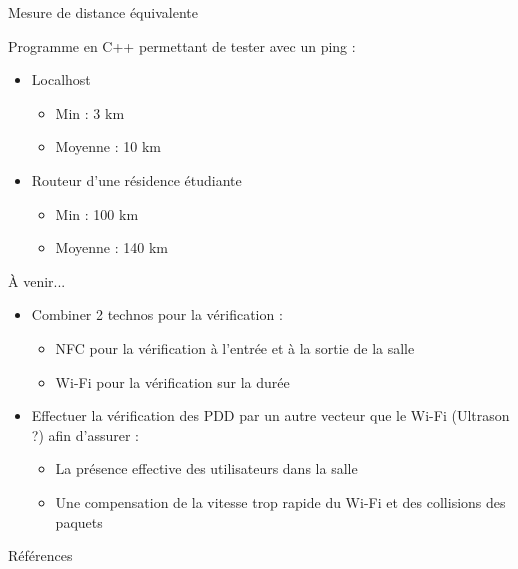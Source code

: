 \documentclass[aspectratio=169]{beamer}
\begin{document}
\begin{frame}{Mesure de distance équivalente}
        
    Programme en C++ permettant de tester avec un ping :
    \begin{itemize}
        \item Localhost
        \begin{itemize}
            \item Min : 3 km
            \item Moyenne : 10 km
        \end{itemize}
        \item Routeur d'une résidence étudiante
        \begin{itemize}
            \item Min : 100 km
            \item Moyenne : 140 km
        \end{itemize}
    \end{itemize}

\end{frame}

\begin{frame}{À venir...}
    
    \begin{itemize}
        \item Combiner 2 technos pour la vérification :
        \begin{itemize}
            \item NFC pour la vérification à l'entrée et à la sortie de la salle
            \item Wi-Fi pour la vérification sur la durée
        \end{itemize}
        \pause
        \bigskip
        \item Effectuer la vérification des PDD par un autre vecteur que le Wi-Fi (Ultrason ?) afin d'assurer :
        \begin{itemize}
            \item La présence effective des utilisateurs dans la salle
            \item Une compensation de la vitesse trop rapide du Wi-Fi et des collisions des paquets
        \end{itemize}

    \end{itemize}

    
\end{frame}

\begin{frame}{Références}
  \printbibliography
\end{frame}
\end{document}

